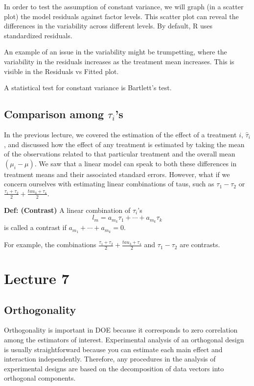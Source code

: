 \documentclass[12pt, oneside]{article}
\begin{document}
In order to test the assumption of constant variance, we will graph (in a scatter plot) the model residuals against factor levels. This scatter plot can reveal the differences in the variability across different levels. By default, R uses standardized residuals.

An example of an issue in the variability might be trumpetting, where the variability in the residuals increases as the treatment mean increases. This is visible in the Residuals vs Fitted plot. 

A statistical test for constant variance is Bartlett's test.

\subsection{Comparison among $\tau_{i}$'s}
In the previous lecture, we covered the estimation of the effect of a treatment $i$, $\hat{\tau}_{i}$, and discussed 
how the effect of any treatment is estimated by taking the mean of the observations related to that particular treatment 
and the overall mean $(\mu_{i} - \mu)$. We saw that a linear model can speak to both these differences in treatment means 
and their associated standard errors. However, what if we concern ourselves with estimating linear combinations of taus, 
such as $\tau_{1} - \tau_{2}$ or $\frac{\tau_{1} + \tau_{2}}{2} + \frac{tau_{3} + \tau_{4}}{2}$. \newline


\textbf{Def: (Contrast)} A linear combination of $\tau_{i}$'s \[l_{m} = a_{m_{k}}\tau_{1} + \cdots + a_{m_{k}} \tau_{k}\]is called a contrast if $a_{m_1} + \cdots + a_{m_{k}} = 0$. 

For example, the combinations $\frac{\tau_{1} + \tau_{2}}{2} + \frac{tau_{3} + \tau_{4}}{2}$ and $\tau_{1} - \tau_{2}$ are contrasts. 

\section{Lecture 7}

\subsection{Orthogonality}

Orthogonality is important in DOE because it corresponds to zero correlation among the estimators of interest. Experimental analysis of an orthogonal design is usually straightforward because you can estimate each main effect and interaction independently. Therefore, any procedures in the analysis of experimental designs are based on the decomposition of data vectors into orthogonal components. 
\end{document}

